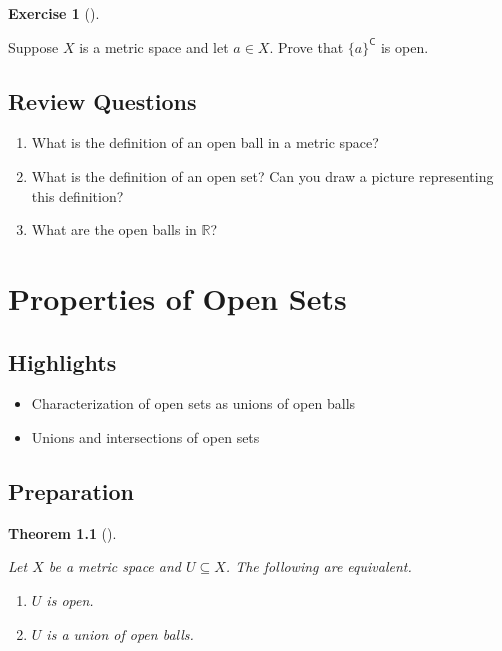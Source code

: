 \documentclass[
  letterpaper,
  DIV=11,
  numbers=noendperiod]{scrreprt}
\providecommand{\tightlist}{%
  \setlength{\itemsep}{0pt}\setlength{\parskip}{0pt}}
\def\R{\mathbb R}
\newcommand{\cee}{\mathsf{C}}
\theoremstyle{plain}
\newtheorem{theorem}{Theorem}[chapter]
\theoremstyle{definition}
\newtheorem{exercise}{Exercise}[chapter]
\theoremstyle{plain}
\theoremstyle{plain}
\theoremstyle{definition}
\theoremstyle{definition}
\theoremstyle{remark}
\begin{document}
\begin{exercise}[]\protect\hypertarget{exr-complement-of-point-is-open}{}\label{exr-complement-of-point-is-open}

Suppose \(X\) is a metric space and let \(a\in X\). Prove that
\(\{a\}^\cee\) is open.

\end{exercise}

\section*{Review Questions}\label{review-questions-5}


\begin{enumerate}
\def\labelenumi{\arabic{enumi}.}
\tightlist
\item
  What is the definition of an open ball in a metric space?
\item
  What is the definition of an open set? Can you draw a picture
  representing this definition?
\item
  What are the open balls in \(\R\)?
\end{enumerate}

\chapter{Properties of Open Sets}\label{properties-of-open-sets}

\section*{Highlights}\label{highlights-6}


\begin{itemize}
\tightlist
\item
  Characterization of open sets as unions of open balls
\item
  Unions and intersections of open sets
\end{itemize}

\section{Preparation}\label{preparation-6}

\begin{theorem}[]\protect\hypertarget{thm-open-set-tfae}{}\label{thm-open-set-tfae}

Let \(X\) be a metric space and \(U\subseteq X\). The following are
equivalent.

\begin{enumerate}
\def\labelenumi{\arabic{enumi}.}
\tightlist
\item
  \(U\) is open.
\item
  \(U\) is a union of open balls.
\end{enumerate}

\end{theorem}
\end{document}
